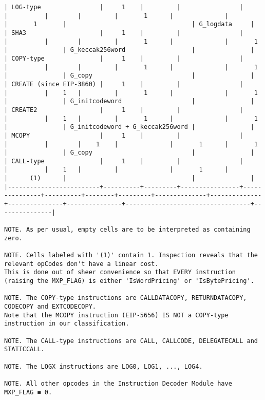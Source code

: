 \documentclass[varwidth=\maxdimen,margin=0.5cm,multi={verbatim}]{standalone}
\begin{document}
\begin{verbatim}
| LOG-type                |     1    |         |                |               |          |        |         |       1      |              |               |       1       |                                  | G_logdata     |
| SHA3                    |     1    |         |                |               |          |        |         |       1      |              |       1       |               | G_keccak256word                  |               |
| COPY-type               |     1    |         |                |               |          |        |         |       1      |              |       1       |               | G_copy                           |               |
| CREATE (since EIP-3860) |     1    |         |                |               |          |    1   |         |       1      |              |       1       |               | G_initcodeword                   |               |
| CREATE2                 |     1    |         |                |               |          |    1   |         |       1      |              |       1       |               | G_initcodeword + G_keccak256word |               |
| MCOPY                   |     1    |         |                |               |          |        |    1    |              |       1      |       1       |               | G_copy                           |               |
| CALL-type               |     1    |         |                |               |          |    1   |         |              |       1      |               |      (1)      |                                  |               |
|-------------------------+----------+---------+----------------+---------------+----------+--------+---------+--------------+--------------+---------------+---------------+----------------------------------+---------------|

NOTE. As per usual, empty cells are to be interpreted as containing zero.

NOTE. Cells labeled with '(1)' contain 1. Inspection reveals that the relevant opCodes don't have a linear cost.
This is done out of sheer convenience so that EVERY instruction (raising the MXP_FLAG) is either 'IsWordPricing' or 'IsBytePricing'.

NOTE. The COPY-type instructions are CALLDATACOPY, RETURNDATACOPY, CODECOPY and EXTCODECOPY.
Note that the MCOPY instruction (EIP-5656) IS NOT a COPY-type instruction in our classification.

NOTE. The CALL-type instructions are CALL, CALLCODE, DELEGATECALL and STATICCALL.

NOTE. The LOGX instructions are LOG0, LOG1, ..., LOG4.

NOTE. All other opcodes in the Instruction Decoder Module have MXP_FLAG ≡ 0.

\end{verbatim}
\end{document}

